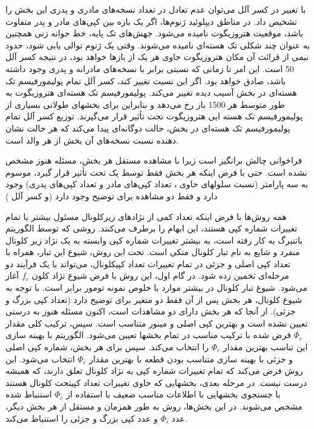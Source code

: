 با تغییر در کسر آلل می‌توان عدم تعادل در تعداد نسخه‌های مادری و پدری این بخش را تشخیص داد. در مناطق دیپلوئید ژنوم‌ها، اگر یک بازه بین کپی‌های مادر و پدر متفاوت باشد، موقعیت هتروزیگوت نامیده می‌شود. جهش‌های تک پایه، خط جوانه زنی همچنین به عنوان چند شکلی تک هسته‌ای نامیده می‌شوند. وقتی یک ژنوم توالی یابی شود، حدود نیمی از قرائت آن مکان هتروزیگوت حاوی هر یک از بازها خواهد بود، در نتیجه کسر آلل 50 است. این امر تا زمانی که نسبتی برابر با نسخه‌های مادرانه و پدری وجود داشته باشد، صادق خواهد بود. اگر این نسبت تغییر کند، کسر آلل  تمام پولیمورفیسم تک هسته‌ای در بخش آسیب دیده تغییر می‌کند. پولیمورفیسم تک هسته‌ای هتروزیگوت به طور متوسط هر 1500 باز \cite{chen2012personal} رخ می‌دهد و بنابراین برای بخشهای طولانی بسیاری از پولیمورفیسم تک هسته ایی هتروزیگوت تحت تأثیر قرار می‌گیرند. توزیع کسر آلل  تمام پولیمورفیسم تک هسته‌ای در بخش، حالت دوگانه‌ای پیدا می‌کند که هر حالت نشان دهنده نسبت نسخه‌های آن بخش از هر والد است.

فراخوانی  چالش برانگیز است زیرا با مشاهده مستقل هر بخش، مسئله هنوز مشخص نشده است. حتی با فرض اینکه هر بخش فقط توسط یک  تحت تأثیر قرار گیرد،  موسوم به سه پارامتر (نسبت سلولهای حاوی ، تعداد کپی‌های مادر و تعداد کپی‌های پدری) وجود دارد و فقط دو مشاهده برای توضیح وجود دارد (و کسر آلل )

همه روش‌ها با فرض اینکه تعداد کمی از نژادهای زیرکلونال مسئول بیشتر یا تمام تغییرات شماره کپی هستند، این ابهام را برطرف می‌کنند. روشی که توسط الگوریتم باتنبرگ \cite{nik2012life} به کار رفته است، به بیشتر تغییرات شماره کپی وابسته به یک نژاد زیر کلونال منفرد و شایع به نام تبار کلونال متکی است. تحت این روش، شیوع این تبار، همراه با تعداد کپی اصلی و جزئی در تمام تغییرات تعداد کپیکلونال، می‌تواند با یک فرآیند دو مرحله‌ای تخمین زده شود. در گام اول، این روش با فرض شیوع نژاد کلون $f_c$  آغاز می‌شود. شیوع تبار کلونال در بیشتر موارد با خلوص نمونه تومور برابر است. با توجه به شیوع کلونال، هر بخش پس از آن فقط دو متغیر برای توضیح دارد (تعداد کپی بزرگ و جزئی). از آنجا که هر بخش دارای دو مشاهدات است، اکنون مسئله هنوز به درستی تعیین نشده است و بهترین کپی اصلی و مینور متناسب است. سپس، ترکیب کلی مقدار $\Phi_c$  فرض شده با ترکیب مناسب در تمام بخشها تعیین می‌شود. الگوریتم با بهینه سازی این تناسب بهترین مقدار $\Phi_c$  را انتخاب می‌کند. سپس برای هر بخش، شماره کپی اصلی و جزئی با بهینه سازی متناسب بودن قطعه با بهترین مقدار $\Phi_c$   انتخاب می‌شود. این روش فرض می‌کند که تمام تغییرات شماره کپی به نژاد کلونال تعلق دارند، که همیشه درست نیست. در مرحله بعدی، بخشهایی که حاوی تغییرات تعداد کپیتحت کلونال هستند با جستجوی بخشهایی با اطلاعات مناسب ضعیف با استفاده از $\Phi_c$   استنباط شده مشخص می‌شوند. در این بخش‌ها، روش به طور همزمان و مستقل از هر بخش دیگر، عدد $\Phi_i$   و عدد کپی بزرگ و جزئی را استنباط می‌کند.


